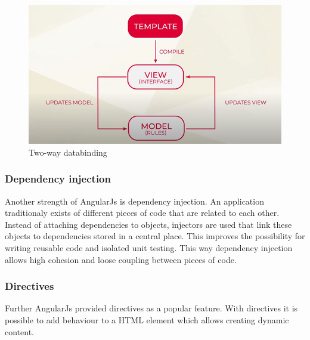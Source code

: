 \autocite{Rauh}

\begin{figure}[h!]
    \caption{Two-way databinding}
    \centering
    \includegraphics[width=\textwidth]{img/twowaydata.png} 
\end{figure}



\subsubsection{Dependency injection}
Another strength of AngularJs is dependency injection. An application traditionaly exists of different pieces of code that are related to each other.  Instead of attaching dependencies to objects, injectors are used that link these objects to dependencies stored in a central place. This improves the possibility for writing reusable code and isolated unit testing. \autocite{AltexSoft} This way dependency injection allows high cohesion and loose coupling between pieces of code. \autocite{Sterkowitz}


\subsubsection{Directives}
Further AngularJs provided directives as a popular feature. With directives it is possible to add behaviour to a HTML element which allows creating dynamic content. \autocite{AngularJs}

